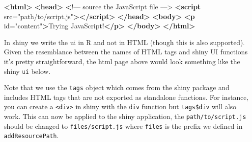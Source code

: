 \documentclass[
]{krantz}
\makeatletter
\newenvironment{Shaded}{\begin{snugshade}}{\end{snugshade}}
\newcommand{\DataTypeTok}[1]{\textcolor[rgb]{0.27,0.27,0.27}{#1}}
\newcommand{\ErrorTok}[1]{\textcolor[rgb]{0.14,0.14,0.14}{\textbf{#1}}}
\newcommand{\KeywordTok}[1]{\textcolor[rgb]{0.27,0.27,0.27}{\textbf{#1}}}
\newcommand{\NormalTok}[1]{#1}
\newcommand{\OperatorTok}[1]{\textcolor[rgb]{0.43,0.43,0.43}{\textbf{#1}}}
\newcommand{\OtherTok}[1]{\textcolor[rgb]{0.37,0.37,0.37}{#1}}
\newcommand{\StringTok}[1]{\textcolor[rgb]{0.5,0.5,0.5}{#1}}
\newenvironment{kframe}{%
\medskip{}
\setlength{\fboxsep}{.8em}
 \def\at@end@of@kframe{}%
 \ifinner\ifhmode%
  \def\at@end@of@kframe{\end{minipage}}%
  \begin{minipage}{\columnwidth}%
 \fi\fi%
 \def\FrameCommand##1{\hskip\@totalleftmargin \hskip-\fboxsep
 \colorbox{shadecolor}{##1}\hskip-\fboxsep
     \hskip-\linewidth \hskip-\@totalleftmargin \hskip\columnwidth}%
 \MakeFramed {\advance\hsize-\width
   \@totalleftmargin\z@ \linewidth\hsize
   \@setminipage}}%
 {\par\unskip\endMakeFramed%
 \at@end@of@kframe}
\renewenvironment{Shaded}{\begin{kframe}}{\end{kframe}}
\makeatother
\begin{document}
\begin{Shaded}
\begin{Highlighting}[]
\KeywordTok{<html>}
  \KeywordTok{<head>}
    \ErrorTok{<}\NormalTok{!–– source the JavaScript file ––>}
    \KeywordTok{<script}\OtherTok{ src=}\StringTok{"path/to/script.js"}\KeywordTok{></script>}
  \KeywordTok{</head>}
  \KeywordTok{<body>}
    \KeywordTok{<p}\OtherTok{ id=}\StringTok{"content"}\KeywordTok{>}\NormalTok{Trying JavaScript!}\KeywordTok{</p>}
  \KeywordTok{</body>}
\KeywordTok{</html>}
\end{Highlighting}
\end{Shaded}

In shiny we write the ui in R and not in HTML (though this is also supported). Given the resemblance between the names of HTML tags and shiny UI functions it's pretty straightforward, the html page above would look something like the shiny \texttt{ui} below.

\begin{Shaded}
\end{Shaded}

Note that we use the \texttt{tags} object which comes from the shiny package and includes HTML tags that are not exported as standalone functions. For instance, you can create a \texttt{\textless{}div\textgreater{}} in shiny with the \texttt{div} function but \texttt{tags\$div} will also work. This can now be applied to the shiny application, the \texttt{path/to/script.js} should be changed to \texttt{files/script.js} where \texttt{files} is the prefix we defined in \texttt{addResourcePath}.
\end{document}
